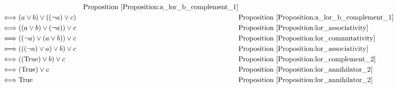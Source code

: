 \begin{prop}
\begin{align*}
& & \text{Proposition \ref{Proposition:a_lor_b_complement_1}} \\
\iff & (a \lor b) \lor ((\lnot a) \lor c)
& & \text{Proposition \ref{Proposition:a_lor_b_complement_1}} \\
\iff & ((a \lor b) \lor (\lnot a)) \lor c
& & \text{Proposition \ref{Proposition:lor_associativity}} \\
\iff & ((\lnot a) \lor (a \lor b)) \lor c
& & \text{Proposition \ref{Proposition:lor_commutativity}} \\
\iff & (((\lnot a) \lor a) \lor b) \lor c
& & \text{Proposition \ref{Proposition:lor_associativity}} \\
\iff & ((\text{True}) \lor b) \lor c
& & \text{Proposition \ref{Proposition:lor_complement_2}} \\
\iff & (\text{True}) \lor c
& & \text{Proposition \ref{Proposition:lor_annihilator_2}} \\
\iff & \text{True}
& & \text{Proposition \ref{Proposition:lor_annihilator_2}} \\
\end{align*}
\end{prop}


